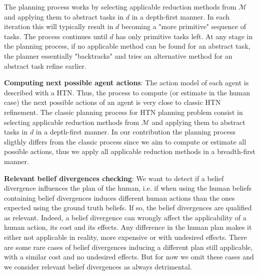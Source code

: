 \documentclass[letterpaper]{article} %
\begin{document}
The planning process works by selecting applicable reduction methods from $\mathcal{M}$ and applying them to abstract tasks in $d$ in a depth-first manner. In each iteration this will typically result in $d$ becoming a "more primitive" sequence of tasks. The process continues until $d$ has only primitive tasks left. At any stage in the planning process, if no applicable method can be found for an abstract task, the planner essentially "backtracks" and tries an alternative method for an abstract task refine earlier.

\textbf{Computing next possible agent actions}:
The action model of each agent is described with a HTN. Thus, the process to compute (or estimate in the human case) the next possible actions of an agent is very close to classic HTN refinement.
The classic planning process for HTN planning problem consist in selecting applicable reduction methods from $\mathcal{M}$ and applying them to abstract tasks in $d$ in a depth-first manner. In our contribution the planning process sligthly differs from the classic process since we aim to compute or estimate all possible actions, thus we apply all applicable reduction methods in a breadth-first manner.

\textbf{Relevant belief divergences checking}:
We want to detect if a belief divergence influences the plan of the human, i.e. if when using the human beliefs containing belief divergences induces different human actions than the ones expected using the ground truth beliefs. If so, the belief divergences are qualified as relevant. Indeed, a belief divergence can wrongly affect the applicability of a human action, its cost and its effects. 
Any difference in the human plan makes it either not applicable in reality, more expensive or with undesired effects. There are some rare cases of belief divergences inducing a different plan still applicable, with a similar cost and no undesired effects. But for now we omit these cases and we consider relevant belief divergences as always detrimental.
\end{document}

